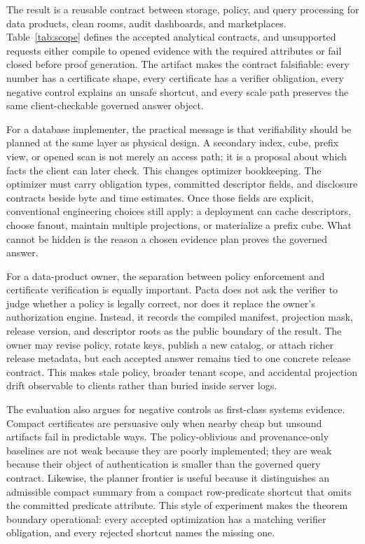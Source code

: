 \documentclass[conference]{IEEEtran}
\newcommand{\sys}{Pacta\xspace}
\begin{document}
The result is a reusable contract between storage, policy, and query processing for data products, clean rooms, audit dashboards, and marketplaces. Table~\ref{tab:scope} defines the accepted analytical contracts, and unsupported requests either compile to opened evidence with the required attributes or fail closed before proof generation. The artifact makes the contract falsifiable: every number has a certificate shape, every certificate has a verifier obligation, every negative control explains an unsafe shortcut, and every scale path preserves the same client-checkable governed answer object.

For a database implementer, the practical message is that verifiability should be planned at the same layer as physical design. A secondary index, cube, prefix view, or opened scan is not merely an access path; it is a proposal about which facts the client can later check. This changes optimizer bookkeeping. The optimizer must carry obligation types, committed descriptor fields, and disclosure contracts beside byte and time estimates. Once those fields are explicit, conventional engineering choices still apply: a deployment can cache descriptors, choose fanout, maintain multiple projections, or materialize a prefix cube. What cannot be hidden is the reason a chosen evidence plan proves the governed answer.

For a data-product owner, the separation between policy enforcement and certificate verification is equally important. \sys does not ask the verifier to judge whether a policy is legally correct, nor does it replace the owner's authorization engine. Instead, it records the compiled manifest, projection mask, release version, and descriptor roots as the public boundary of the result. The owner may revise policy, rotate keys, publish a new catalog, or attach richer release metadata, but each accepted answer remains tied to one concrete release contract. This makes stale policy, broader tenant scope, and accidental projection drift observable to clients rather than buried inside server logs.

The evaluation also argues for negative controls as first-class systems evidence. Compact certificates are persuasive only when nearby cheap but unsound artifacts fail in predictable ways. The policy-oblivious and provenance-only baselines are not weak because they are poorly implemented; they are weak because their object of authentication is smaller than the governed query contract. Likewise, the planner frontier is useful because it distinguishes an admissible compact summary from a compact row-predicate shortcut that omits the committed predicate attribute. This style of experiment makes the theorem boundary operational: every accepted optimization has a matching verifier obligation, and every rejected shortcut names the missing one.
\end{document}
